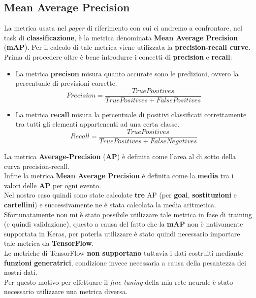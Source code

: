 \subsection{Mean Average Precision}
La metrica usata nel \textit{paper} di riferimento con cui ci andremo a confrontare, nel task di \textbf{classificazione}, è la metrica denominata \textbf{Mean Average Precision} (\textbf{mAP}). Per il calcolo di tale metrica viene utilizzata la \textbf{precision-recall curve}.
\\Prima di procedere oltre è bene introdurre i concetti di \textbf{precision} e \textbf{recall}:
\begin{itemize}
\item La metrica \textbf{precison} misura quanto accurate sono le predizioni, ovvero la percentuale di previsioni corrette.
\begin{equation}
Precision=\frac{True Positives}{True Positives + False Positives}
\label{Precision}
\end{equation}
\item La metrica \textbf{recall} misura la percentuale di positivi classificati correttamente tra tutti gli elementi appartenenti ad una certa classe.
\begin{equation}
Recall=\frac{True Positives}{True Positives + False Negatives}
\label{Recall}
\end{equation}
\end{itemize}
La metrica \textbf{Average-Precision} (\textbf{AP}) è definita come l'area al di sotto della curva precision-recall.
\\Infine la metrica \textbf{Mean Average Precision} è definita come la \textbf{media} tra i valori delle \textbf{AP} per ogni evento. 
\\Nel nostro caso quindi sono state calcolate \textbf{tre} AP (per \textbf{goal}, \textbf{sostituzioni} e \textbf{cartellini}) e successivamente ne è stata calcolata la media aritmetica.
\\Sfortunatamente non mi è stato possibile utilizzare tale metrica in fase di training (e quindi validazione), questo a causa del fatto che la \textbf{mAP} non è nativamente supportata in Keras, per poterla utilizzare è stato quindi necessario importare tale metrica da \textbf{TensorFlow}.
\\Le metriche di TensorFlow \textbf{non supportano} tuttavia i dati costruiti mediante \textbf{funzioni generatrici}, condizione invece necessaria a causa della pesantezza dei nostri dati.
\\Per questo motivo per effettuare il \textit{fine-tuning} della mia rete neurale è stato necessario utilizzare una metrica diversa.
